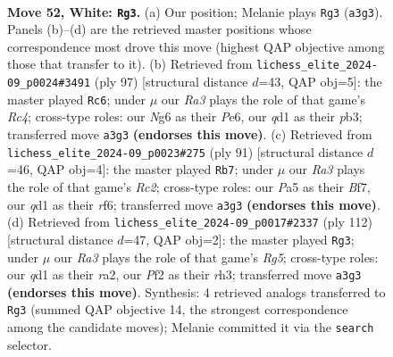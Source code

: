 \documentclass[11pt]{article}
\begin{document}
\clearpage

\begin{figure}[p]\centering
\begin{subfigure}{0.46\textwidth}\centering
\resizebox{\linewidth}{!}{%
\newchessgame
\chessboard[
  setfen={8/2r3pk/1p4N1/P5r1/3pp3/R7/5PK1/3q4 w - - 1 52},
  showmover=false,
  pgfstyle=straightmove, color=movearrow, markmove={a3-g3}
]}
\caption{}
\end{subfigure}\hfill
\begin{subfigure}{0.46\textwidth}\centering
\resizebox{\linewidth}{!}{%
\newchessgame
\chessboard[
  setfen={8/7k/4p2p/1pr5/3P1P2/1PN1R1P1/6K1/8 b - - 0 49},
  showmover=false,
  pgfstyle=straightmove, color=movearrow, markmove={c5-c6}
]}
\caption{}
\end{subfigure}
\\[4pt]
\begin{subfigure}{0.46\textwidth}\centering
\resizebox{\linewidth}{!}{%
\newchessgame
\chessboard[
  setfen={8/2r2b2/1P3R2/4P1k1/2pPpp2/P1K5/8/8 b - - 0 46},
  showmover=false,
  pgfstyle=straightmove, color=movearrow, markmove={c7-b7}
]}
\caption{}
\end{subfigure}\hfill
\begin{subfigure}{0.46\textwidth}\centering
\resizebox{\linewidth}{!}{%
\newchessgame
\chessboard[
  setfen={8/6k1/5pP1/6Rp/7P/5p1r/r7/6K1 w - - 0 57},
  showmover=false,
  pgfstyle=straightmove, color=movearrow, markmove={g5-g3}
]}
\caption{}
\end{subfigure}
\caption{\textbf{Move 52, White: \texttt{Rg3}.} (a) Our position; Melanie plays \texttt{Rg3} (\texttt{a3g3}). Panels (b)--(d) are the retrieved master positions whose correspondence most drove this move (highest QAP objective among those that transfer to it). (b) Retrieved from \texttt{lichess\_elite\_2024-09\_p0024\#3491} (ply 97) [structural distance $d$=43, QAP obj=5]: the master played \texttt{Rc6}; under $\mu$ our \emph{Ra3} plays the role of that game's \emph{Rc4}; cross-type roles: our \emph{N}g6 as their \emph{P}e6, our \emph{q}d1 as their \emph{p}b3; transferred move \texttt{a3g3} \textbf{(endorses this move)}. (c) Retrieved from \texttt{lichess\_elite\_2024-09\_p0023\#275} (ply 91) [structural distance $d$=46, QAP obj=4]: the master played \texttt{Rb7}; under $\mu$ our \emph{Ra3} plays the role of that game's \emph{Rc2}; cross-type roles: our \emph{P}a5 as their \emph{B}f7, our \emph{q}d1 as their \emph{r}f6; transferred move \texttt{a3g3} \textbf{(endorses this move)}. (d) Retrieved from \texttt{lichess\_elite\_2024-09\_p0017\#2337} (ply 112) [structural distance $d$=47, QAP obj=2]: the master played \texttt{Rg3}; under $\mu$ our \emph{Ra3} plays the role of that game's \emph{Rg5}; cross-type roles: our \emph{q}d1 as their \emph{r}a2, our \emph{P}f2 as their \emph{r}h3; transferred move \texttt{a3g3} \textbf{(endorses this move)}. Synthesis: 4 retrieved analogs transferred to \texttt{Rg3} (summed QAP objective 14, the strongest correspondence among the candidate moves); Melanie committed it via the \texttt{search} selector.}
\label{fig:thought-m102}
\end{figure}
\end{document}
